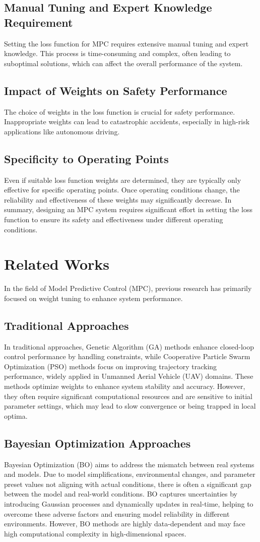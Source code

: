 	\subsection{Manual Tuning and Expert Knowledge Requirement}
	Setting the loss function for MPC requires extensive manual tuning and expert knowledge. This process is time-consuming and complex, often leading to suboptimal solutions, which can affect the overall performance of the system.
	\subsection{Impact of Weights on Safety Performance}
	The choice of weights in the loss function is crucial for safety performance. Inappropriate weights can lead to catastrophic accidents, especially in high-risk applications like autonomous driving.
	\subsection{Specificity to Operating Points}
	Even if suitable loss function weights are determined, they are typically only effective for specific operating points. Once operating conditions change, the reliability and effectiveness of these weights may significantly decrease.
	In summary, designing an MPC system requires significant effort in setting the loss function to ensure its safety and effectiveness under different operating conditions.

\section{Related Works}
In the field of Model Predictive Control (MPC), previous research has primarily focused on weight tuning to enhance system performance.
\subsection{Traditional Approaches}
In traditional approaches, Genetic Algorithm (GA) methods enhance closed-loop control performance by handling constraints, while Cooperative Particle Swarm Optimization (PSO) methods focus on improving trajectory tracking performance, widely applied in Unmanned Aerial Vehicle (UAV) domains. These methods optimize weights to enhance system stability and accuracy. However, they often require significant computational resources and are sensitive to initial parameter settings, which may lead to slow convergence or being trapped in local optima.
\subsection{Bayesian Optimization Approaches}
Bayesian Optimization (BO) aims to address the mismatch between real systems and models. Due to model simplifications, environmental changes, and parameter preset values not aligning with actual conditions, there is often a significant gap between the model and real-world conditions. BO captures uncertainties by introducing Gaussian processes and dynamically updates in real-time, helping to overcome these adverse factors and ensuring model reliability in different environments. However, BO methods are highly data-dependent and may face high computational complexity in high-dimensional spaces.
